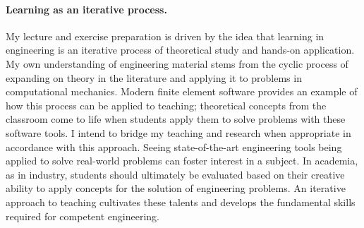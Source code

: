 \documentclass[11pt]{article}
\begin{document}

\paragraph{Learning as an iterative process.}  My lecture and exercise preparation is driven by the idea that learning in engineering is an iterative process of theoretical study and hands-on application.  My own understanding of engineering material stems from the cyclic process of expanding on theory in the literature and applying it to problems in computational mechanics.  Modern finite element software provides an example of how this process can be applied to teaching; theoretical concepts from the classroom come to life when students apply them to solve problems with these software tools.  I intend to bridge my teaching and research when appropriate in accordance with this approach.  Seeing state-of-the-art engineering tools being applied to solve real-world problems can foster interest in a subject.  In academia, as in industry, students should ultimately be evaluated based on their creative ability to apply concepts for the solution of engineering problems.  An iterative approach to teaching cultivates these talents and develops the fundamental skills required for competent engineering.
\end{document}

